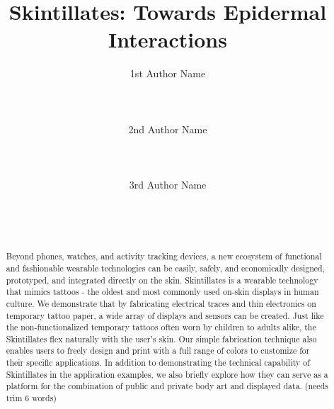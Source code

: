 \documentclass{sigchi}
\begin{document}
\title{Skintillates: Towards Epidermal Interactions}

\author{
  \alignauthor 1st Author Name\\
    \\
    \\
    \\
  \alignauthor 2nd Author Name\\
    \\
    \\
    \\
  \alignauthor 3rd Author Name\\
    \\
    \\
    \\
}

\maketitle

\begin{abstract}
Beyond phones, watches, and activity tracking devices, a new ecosystem of functional and fashionable wearable technologies can be easily, safely, and economically designed, prototyped, and integrated directly on the skin. Skintillates is a wearable technology that mimics tattoos - the oldest and most commonly used on-skin displays in human culture. We demonstrate that by fabricating electrical traces and thin electronics on temporary tattoo paper, a wide array of displays and sensors can be created. Just like the non-functionalized temporary tattoos often worn by children to adults alike, the Skintillates flex naturally with the user's skin. Our simple fabrication technique also enables users to freely design and print with a full range of colors to customize for their specific applications. In addition to demonstrating the technical capability of Skintillates in the application examples, we also briefly explore how they can serve as a platform for the combination of public and private body art and displayed data. (needs trim 6 words)
\end{abstract}

\end{document}
